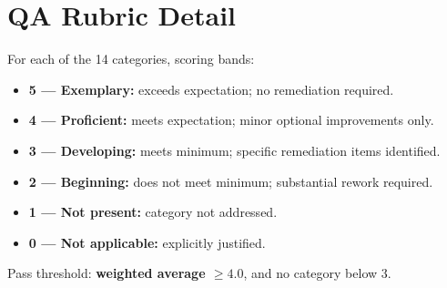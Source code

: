 \chapter{QA Rubric Detail}

For each of the 14 categories, scoring bands:

\begin{itemize}
  \item \textbf{5 — Exemplary:} exceeds expectation; no remediation required.
  \item \textbf{4 — Proficient:} meets expectation; minor optional improvements only.
  \item \textbf{3 — Developing:} meets minimum; specific remediation items identified.
  \item \textbf{2 — Beginning:} does not meet minimum; substantial rework required.
  \item \textbf{1 — Not present:} category not addressed.
  \item \textbf{0 — Not applicable:} explicitly justified.
\end{itemize}

Pass threshold: \textbf{weighted average $\geq 4.0$}, and no category below 3.